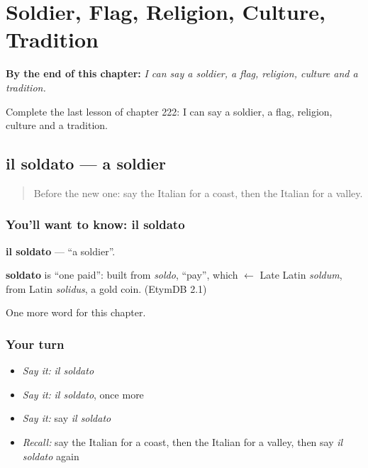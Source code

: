 
\chapter{Soldier, Flag, Religion, Culture, Tradition}
\label{ch:it-soldier-flag-religion-culture-tradition}

\begin{chapteropening}
\textbf{By the end of this chapter:} \emph{I can say a soldier, a flag, religion, culture and a tradition.}

Complete the last lesson of chapter 222: I can say a soldier, a flag, religion, culture and a tradition.
\end{chapteropening}

\section[il soldato]{il soldato — a soldier}

\label{lesson:IT-C222-soldato}



\begin{quote}
Before the new one: say the Italian for a coast, then the Italian for a valley.
\end{quote}

\subsection*{You'll want to know: il soldato}
\textbf{il soldato} — \textquotedblleft{}a soldier\textquotedblright{}.

\begin{cousinweb}
\textbf{soldato} is \textquotedblleft{}one paid\textquotedblright{}: built from \emph{soldo}, \textquotedblleft{}pay\textquotedblright{}, which $\leftarrow$ Late Latin \emph{soldum}, from Latin \emph{solidus}, a gold coin. (EtymDB 2.1)
\end{cousinweb}

\begin{grammarlens}[title={What you've built}]
One more word for this chapter.
\end{grammarlens}

\subsection*{Your turn}
\begin{itemize}
\raggedright
  \item \emph{Say it:} \emph{il soldato}
  \item \emph{Say it:} \emph{il soldato}, once more
  \item \emph{Say it:} say \emph{il soldato}
  \item \emph{Recall:} say the Italian for a coast, then the Italian for a valley, then say \emph{il soldato} again
\end{itemize}

